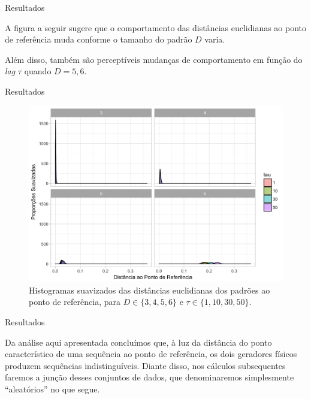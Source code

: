 \documentclass[10pt,xcolor={dvipsnames}]{beamer}
\begin{document}
\begin{frame}{Resultados}{}
\begin{block}{}
	A figura a seguir sugere que o comportamento das distâncias euclidianas ao ponto de referência muda conforme o tamanho do padrão $D$ varia.
	
	Além disso, também são perceptíveis mudanças de comportamento em função do \textit{lag} $\tau$ quando $D=5,6$.
	
\end{block}
\end{frame}

\begin{frame}{Resultados}{}
\begin{block}{}
	\begin{figure}[hbt]
		\centering
		\includegraphics[width=.7\linewidth]{HistoDistanciasAleat}
		\caption{Histogramas suavizados das distâncias euclidianas dos padrões ao ponto de referência, para $D\in\{3,4,5,6\}$ e $\tau\in\{1,10,30,50\}$.}\label{Fig:HistoDistanciasAleat}
	\end{figure}
\end{block}
\end{frame}

\begin{frame}{Resultados}{}
\begin{block}{}
	Da análise aqui apresentada concluímos que, à luz da distância do ponto característico de uma sequência ao ponto de referência, os dois geradores físicos produzem sequências indistinguíveis.
	Diante disso, nos cálculos subsequentes faremos a junção desses conjuntos de dados, que denominaremos simplesmente ``aleatórios'' no que segue.
\end{block}
\end{frame}

\end{document}
